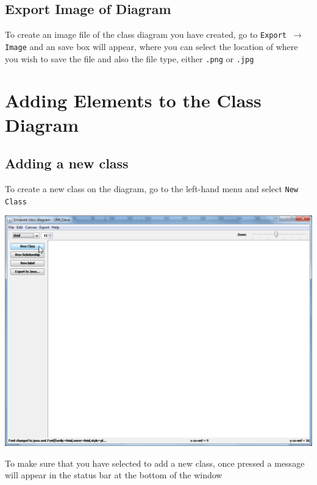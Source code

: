 \documentclass[a4paper]{article}
\begin{document}
\subsection{Export Image of Diagram}
To create an image file of the class diagram you have created, go to \texttt{Export $\rightarrow$ Image} and an save box will appear, where you can select the location of where you wish to save the file and also the file type, either \texttt{.png} or \texttt{.jpg}

\newpage
\section{Adding Elements to the Class Diagram}
\subsection{Adding a new class}
To create a new class on the diagram, go to the left-hand menu and select \texttt{New Class}
\begin{center}\includegraphics[trim = 0pt 300pt 700pt 0pt, clip, scale=0.4]{./images/addnewclass1.png} \end{center}
To make sure that you have selected to add a new class, once pressed a message will appear in the status bar at the bottom of the window
\end{document}
